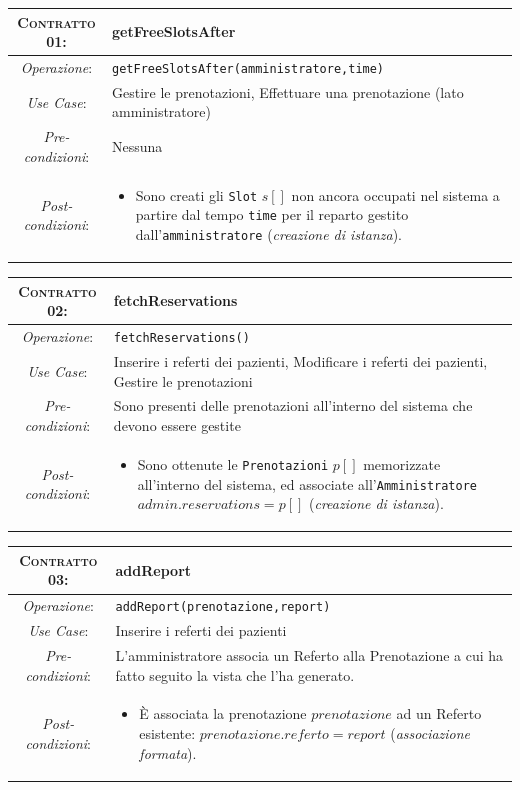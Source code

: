 \begin{tabularx}{\columnwidth}{cX}
\toprule
\textsc{Contratto 01}:& \textbf{getFreeSlotsAfter}\\
\midrule
\textit{Operazione}: & 	\texttt{getFreeSlotsAfter(amministratore,time)}\\
\textit{Use Case}: &	Gestire le prenotazioni, Effettuare una prenotazione (lato amministratore)\\
\textit{Pre-condizioni}: &  Nessuna\\
\textit{Post-condizioni}: & \begin{itemize}
\item Sono creati gli \texttt{Slot} $s[]$ non ancora occupati nel sistema a partire
	dal tempo \texttt{time} per il reparto gestito dall'\texttt{amministratore}
	(\textit{creazione di istanza}).
\end{itemize}\\
\bottomrule
\end{tabularx}
\medskip

\begin{tabularx}{\columnwidth}{cX}
\toprule
\textsc{Contratto 02}:& \textbf{fetchReservations}\\
\midrule
\textit{Operazione}: & 	\texttt{fetchReservations()}\\
\textit{Use Case}: &	Inserire i referti dei pazienti, Modificare i referti 
			dei pazienti, Gestire le prenotazioni\\
\textit{Pre-condizioni}: &  Sono presenti delle prenotazioni all'interno del
			sistema che devono essere gestite\\
\textit{Post-condizioni}: & \begin{itemize}
\item Sono ottenute le \texttt{Prenotazioni} $p[]$ memorizzate all'interno del sistema,
	ed associate all'\texttt{Amministratore} $admin.reservations = p[]$
	(\textit{creazione di istanza}).
\end{itemize}\\
\bottomrule
\end{tabularx}
\medskip


\begin{tabularx}{\columnwidth}{cX}
\toprule
\textsc{Contratto 03}: & 	\textbf{addReport}\\
\midrule
\textit{Operazione}: & 	\texttt{addReport(prenotazione,report)}\\
\textit{Use Case}: &	Inserire i referti dei pazienti\\
\textit{Pre-condizioni}: &  L'amministratore associa un Referto alla Prenotazione
			a cui ha fatto seguito la vista che l'ha generato.\\
\textit{Post-condizioni}: & \begin{itemize}
\item È associata la prenotazione $prenotazione$ ad un Referto esistente: $prenotazione.referto = report$
(\textit{associazione formata}).
\end{itemize}\\
\bottomrule
\end{tabularx}
\medskip

